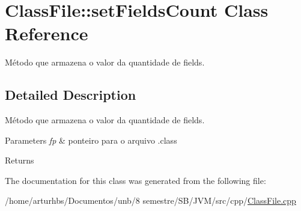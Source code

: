 \hypertarget{classClassFile_1_1setFieldsCount}{}\section{Class\+File\+:\+:set\+Fields\+Count Class Reference}
\label{classClassFile_1_1setFieldsCount}


Método que armazena o valor da quantidade de fields.  




\subsection{Detailed Description}
Método que armazena o valor da quantidade de fields. 


\begin{DoxyParams}{Parameters}
{\em fp} & ponteiro para o arquivo .class \\
\hline
\end{DoxyParams}
\begin{DoxyReturn}{Returns}

\end{DoxyReturn}


The documentation for this class was generated from the following file\+:\begin{DoxyCompactItemize}
\item 
/home/arturhbs/\+Documentos/unb/8 semestre/\+S\+B/\+J\+V\+M/src/cpp/\hyperlink{ClassFile_8cpp}{Class\+File.\+cpp}\end{DoxyCompactItemize}
